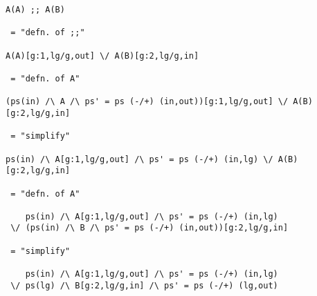 \newpage
{}

\begin{verbatim}
A(A) ;; A(B)

 = "defn. of ;;"

A(A)[g:1,lg/g,out] \/ A(B)[g:2,lg/g,in]

 = "defn. of A"

(ps(in) /\ A /\ ps' = ps (-/+) (in,out))[g:1,lg/g,out] \/ A(B)[g:2,lg/g,in]

 = "simplify"

ps(in) /\ A[g:1,lg/g,out] /\ ps' = ps (-/+) (in,lg) \/ A(B)[g:2,lg/g,in]

 = "defn. of A"

    ps(in) /\ A[g:1,lg/g,out] /\ ps' = ps (-/+) (in,lg)
 \/ (ps(in) /\ B /\ ps' = ps (-/+) (in,out))[g:2,lg/g,in]

 = "simplify"

    ps(in) /\ A[g:1,lg/g,out] /\ ps' = ps (-/+) (in,lg)
 \/ ps(lg) /\ B[g:2,lg/g,in] /\ ps' = ps (-/+) (lg,out)
\end{verbatim}

\newpage
{}

